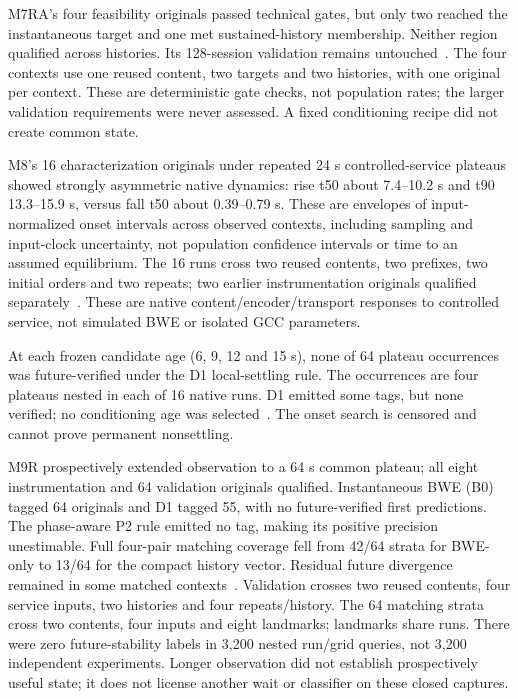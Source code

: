 \documentclass[10pt]{article}
\begin{document}
M7RA's four feasibility originals passed technical gates, but only two reached
the instantaneous target and one met sustained-history membership. Neither
region qualified across histories. Its 128-session validation remains
untouched~\cite{m7ra}. The four contexts use one reused content, two targets and
two histories, with one original per context. These are deterministic gate checks,
not population rates; the larger validation requirements were never assessed.
A fixed conditioning recipe did not create common state.

M8's 16 characterization originals under repeated 24 s controlled-service plateaus
showed strongly asymmetric native dynamics: rise t50 about 7.4--10.2 s and t90
13.3--15.9 s, versus fall t50 about 0.39--0.79 s. These are envelopes of
input-normalized onset intervals across observed contexts, including sampling
and input-clock uncertainty, not population confidence intervals or time to an
assumed equilibrium. The 16 runs cross two reused contents, two prefixes, two
initial orders and two repeats; two earlier instrumentation originals qualified
separately~\cite{m8}. These are native content/encoder/transport responses to
controlled service, not simulated BWE or isolated GCC parameters.

At each frozen candidate age (6, 9, 12 and 15 s), none of 64 plateau occurrences
was future-verified under the D1 local-settling rule. The occurrences are four
plateaus nested in each of 16 native runs. D1 emitted some tags, but none verified;
no conditioning age was selected~\cite{m8}. The onset search is censored and
cannot prove permanent nonsettling.

M9R prospectively extended observation to a 64 s common plateau; all eight
instrumentation and 64 validation originals qualified. Instantaneous BWE (B0)
tagged 64 originals and D1 tagged 55, with no future-verified first predictions.
The phase-aware P2 rule emitted no tag, making its positive precision
unestimable. Full four-pair matching coverage fell from 42/64 strata for
BWE-only to 13/64 for the compact history vector. Residual future divergence
remained in some matched contexts~\cite{m9r}. Validation crosses two reused
contents, four service inputs, two histories and four repeats/history.
The 64 matching strata cross two contents, four inputs and eight landmarks;
landmarks share runs. There were zero future-stability labels in 3,200 nested
run/grid queries, not 3,200 independent experiments. Longer observation did not
establish prospectively useful state; it does not license another wait or
classifier on these closed captures.
\end{document}
